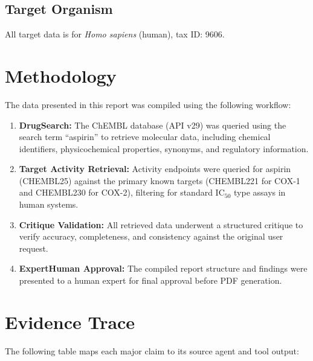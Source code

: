 \documentclass[11pt, a4paper]{article}
\begin{document}
\subsection{Target Organism}
All target data is for \textit{Homo sapiens} (human), tax ID: 9606.

\section{Methodology}
The data presented in this report was compiled using the following workflow:

\begin{enumerate}
    \item \textbf{DrugSearch:} The ChEMBL database (API v29) was queried using the search term ``aspirin'' to retrieve molecular data, including chemical identifiers, physicochemical properties, synonyms, and regulatory information.
    \item \textbf{Target Activity Retrieval:} Activity endpoints were queried for aspirin (CHEMBL25) against the primary known targets (CHEMBL221 for COX-1 and CHEMBL230 for COX-2), filtering for standard IC$_{50}$ type assays in human systems.
    \item \textbf{Critique Validation:} All retrieved data underwent a structured critique to verify accuracy, completeness, and consistency against the original user request.
    \item \textbf{ExpertHuman Approval:} The compiled report structure and findings were presented to a human expert for final approval before PDF generation.
\end{enumerate}

\section{Evidence Trace}
The following table maps each major claim to its source agent and tool output:
\end{document}
